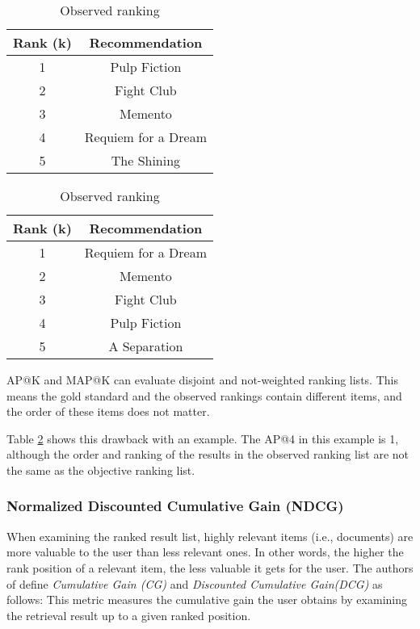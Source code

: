 \begin{table}[!htb]
    \caption{Two lists of objective and observed rankings}
    \label{tab:apk-example}
    \begin{subtable}{.5\linewidth}
        \caption{Objective ranking}
        \centering
        \begin{tabular}{c|c}
            \textbf{Rank (k)}&\textbf{Recommendation} \\
            \hline
            1 & Pulp Fiction \\
            2 & Fight Club \\
            3 & Memento \\
            4 & Requiem for a Dream \\
            5 & The Shining \\
        \end{tabular}
    \end{subtable}%
    \begin{subtable}{.5\linewidth}
        \caption{Observed ranking}
        \centering
        \begin{tabular}{c|c}
            \textbf{Rank (k)}&\textbf{Recommendation} \\
            \hline
            1 & Requiem for a Dream \\
            2 & Memento \\
            3 & Fight Club \\
            4 & Pulp Fiction \\
            5 & A Separation  \\
        \end{tabular}
    \end{subtable}%
\end{table}

AP@K and MAP@K can evaluate disjoint and not-weighted ranking lists. This means the gold standard and the observed rankings contain different items, and the order of these items does not matter.

Table \ref{tab:apk-example} shows this drawback with an example. The AP@4 in this example is 1, although the order and ranking of the results in the observed ranking list are not the same as the objective ranking list.

\subsubsection{Normalized Discounted Cumulative Gain (NDCG)}
\label{subsubsection:cg-dcg-ndcg}
When examining the ranked result list, highly relevant items (i.e., documents) are more valuable to the user than less relevant ones. In other words, the higher the rank position of a relevant item, the less valuable it gets for the user. The authors of \cite{jarvelinCumulatedGainbasedEvaluation2002} define \emph{Cumulative Gain (CG)} and \emph{Discounted Cumulative Gain(DCG)} as follows: This metric measures the cumulative gain the user obtains by examining the retrieval result up to a given ranked position. 


